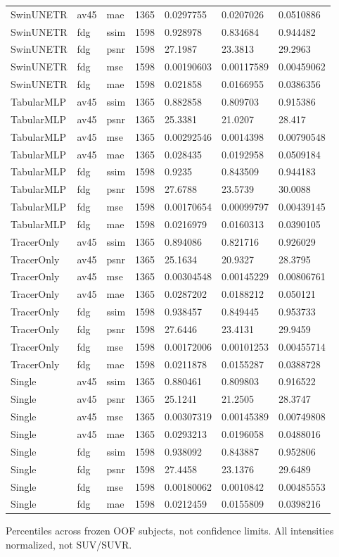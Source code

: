 \begin{longtable}{lllllll}
SwinUNETR & av45 & mae & 1365 & 0.0297755 & 0.0207026 & 0.0510886 \\
SwinUNETR & fdg & ssim & 1598 & 0.928978 & 0.834684 & 0.944482 \\
SwinUNETR & fdg & psnr & 1598 & 27.1987 & 23.3813 & 29.2963 \\
SwinUNETR & fdg & mse & 1598 & 0.00190603 & 0.00117589 & 0.00459062 \\
SwinUNETR & fdg & mae & 1598 & 0.021858 & 0.0166955 & 0.0386356 \\
TabularMLP & av45 & ssim & 1365 & 0.882858 & 0.809703 & 0.915386 \\
TabularMLP & av45 & psnr & 1365 & 25.3381 & 21.0207 & 28.417 \\
TabularMLP & av45 & mse & 1365 & 0.00292546 & 0.0014398 & 0.00790548 \\
TabularMLP & av45 & mae & 1365 & 0.028435 & 0.0192958 & 0.0509184 \\
TabularMLP & fdg & ssim & 1598 & 0.9235 & 0.843509 & 0.944183 \\
TabularMLP & fdg & psnr & 1598 & 27.6788 & 23.5739 & 30.0088 \\
TabularMLP & fdg & mse & 1598 & 0.00170654 & 0.00099797 & 0.00439145 \\
TabularMLP & fdg & mae & 1598 & 0.0216979 & 0.0160313 & 0.0390105 \\
TracerOnly & av45 & ssim & 1365 & 0.894086 & 0.821716 & 0.926029 \\
TracerOnly & av45 & psnr & 1365 & 25.1634 & 20.9327 & 28.3795 \\
TracerOnly & av45 & mse & 1365 & 0.00304548 & 0.00145229 & 0.00806761 \\
TracerOnly & av45 & mae & 1365 & 0.0287202 & 0.0188212 & 0.050121 \\
TracerOnly & fdg & ssim & 1598 & 0.938457 & 0.849445 & 0.953733 \\
TracerOnly & fdg & psnr & 1598 & 27.6446 & 23.4131 & 29.9459 \\
TracerOnly & fdg & mse & 1598 & 0.00172006 & 0.00101253 & 0.00455714 \\
TracerOnly & fdg & mae & 1598 & 0.0211878 & 0.0155287 & 0.0388728 \\
Single & av45 & ssim & 1365 & 0.880461 & 0.809803 & 0.916522 \\
Single & av45 & psnr & 1365 & 25.1241 & 21.2505 & 28.3747 \\
Single & av45 & mse & 1365 & 0.00307319 & 0.00145389 & 0.00749808 \\
Single & av45 & mae & 1365 & 0.0293213 & 0.0196058 & 0.0488016 \\
Single & fdg & ssim & 1598 & 0.938092 & 0.843887 & 0.952806 \\
Single & fdg & psnr & 1598 & 27.4458 & 23.1376 & 29.6489 \\
Single & fdg & mse & 1598 & 0.00180062 & 0.0010842 & 0.00485553 \\
Single & fdg & mae & 1598 & 0.0212459 & 0.0155809 & 0.0398216 \\
\end{longtable}
\noindent\parbox{\linewidth}{\footnotesize Percentiles across frozen OOF subjects, not confidence limits. All intensities normalized, not SUV/SUVR.}
\endgroup
